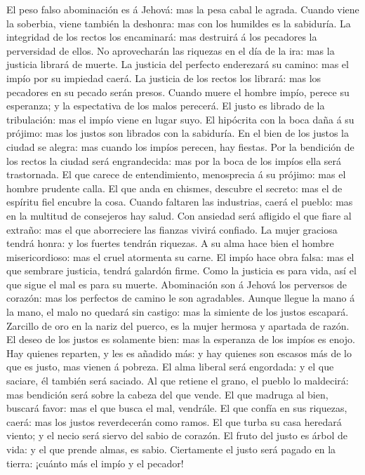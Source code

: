  El peso falso abominación es á Jehová: mas la pesa cabal
le agrada.  Cuando viene la soberbia, viene también la
deshonra: mas con los humildes es la sabiduría.  La
integridad de los rectos los encaminará: mas destruirá á los pecadores
la perversidad de ellos.  No aprovecharán las riquezas en
el día de la ira: mas la justicia librará de muerte.  La
justicia del perfecto enderezará su camino: mas el impío por su impiedad
caerá.  La justicia de los rectos los librará: mas los
pecadores en su pecado serán presos.  Cuando muere el
hombre impío, perece su esperanza; y la espectativa de los malos
perecerá.  El justo es librado de la tribulación: mas el
impío viene en lugar suyo.  El hipócrita con la boca daña
á su prójimo: mas los justos son librados con la sabiduría.
 En el bien de los justos la ciudad se alegra: mas cuando
los impíos perecen, hay fiestas.  Por la bendición de los
rectos la ciudad será engrandecida: mas por la boca de los impíos ella
será trastornada.  El que carece de entendimiento,
menosprecia á su prójimo: mas el hombre prudente calla. 
El que anda en chismes, descubre el secreto: mas el de espíritu fiel
encubre la cosa.  Cuando faltaren las industrias, caerá
el pueblo: mas en la multitud de consejeros hay salud. 
Con ansiedad será afligido el que fiare al extraño: mas el que
aborreciere las fianzas vivirá confiado.  La mujer
graciosa tendrá honra: y los fuertes tendrán riquezas.  A
su alma hace bien el hombre misericordioso: mas el cruel atormenta su
carne.  El impío hace obra falsa: mas el que sembrare
justicia, tendrá galardón firme.  Como la justicia es
para vida, así el que sigue el mal es para su muerte. 
Abominación son á Jehová los perversos de corazón: mas los perfectos de
camino le son agradables.  Aunque llegue la mano á la
mano, el malo no quedará sin castigo: mas la simiente de los justos
escapará.  Zarcillo de oro en la nariz del puerco, es la
mujer hermosa y apartada de razón.  El deseo de los
justos es solamente bien: mas la esperanza de los impíos es enojo.
 Hay quienes reparten, y les es añadido más: y hay
quienes son escasos más de lo que es justo, mas vienen á pobreza.
 El alma liberal será engordada: y el que saciare, él
también será saciado.  Al que retiene el grano, el pueblo
lo maldecirá: mas bendición será sobre la cabeza del que vende.
 El que madruga al bien, buscará favor: mas el que busca
el mal, vendrále.  El que confía en sus riquezas, caerá:
mas los justos reverdecerán como ramos.  El que turba su
casa heredará viento; y el necio será siervo del sabio de corazón.
 El fruto del justo es árbol de vida: y el que prende
almas, es sabio.  Ciertamente el justo será pagado en la
tierra: ¡cuánto más el impío y el pecador!

